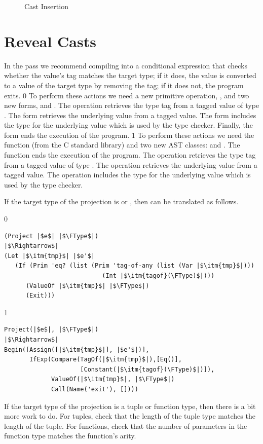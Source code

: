 \documentclass[7x10]{TimesAPriori_MIT}%
\def\racketEd{0}
\def\pythonEd{1}
\def\edition{0}
\numberwithin{theorem}{chapter}
\numberwithin{definition}{chapter}
\numberwithin{equation}{chapter}
\begin{document}
\begin{figure}[btp]
  \caption{Cast Insertion}
\label{fig:compile-r7-Lany}
\end{figure}



\section{Reveal Casts}
\label{sec:reveal-casts-Lany}


In the  pass we recommend compiling 
into a conditional expression that checks whether the value's tag
matches the target type; if it does, the value is converted to a value
of the target type by removing the tag; if it does not, the program
exits.
%
{\if\edition\racketEd
%
To perform these actions we need a new primitive operation,
, and two new forms,  and .
The  operation retrieves the type tag from a tagged
value of type .  The  form retrieves the
underlying value from a tagged value.  The  form
includes the type for the underlying value which is used by the type
checker.  Finally, the  form ends the execution of the
program.
%
\fi}
%
{\if\edition\pythonEd
%
To perform these actions we need the  function (from the C
standard library) and two new AST classes:  and
. The  function ends the execution of the
program.  The  operation retrieves the type tag from a
tagged value of type \ANYTY{}.  The  operation retrieves
the underlying value from a tagged value.  The 
operation includes the type for the underlying value which is used by
the type checker.
%
\fi}


If the target type of the projection is \BOOLTY{} or \INTTY{}, then
 can be translated as follows.
\begin{center}
\begin{minipage}{1.0\textwidth}
{\if\edition\racketEd    
\begin{lstlisting}
(Project |$e$| |$\FType$|)
|$\Rightarrow$|
(Let |$\itm{tmp}$| |$e'$|
   (If (Prim 'eq? (list (Prim 'tag-of-any (list (Var |$\itm{tmp}$|)))
                           (Int |$\itm{tagof}(\FType)$|)))
      (ValueOf |$\itm{tmp}$| |$\FType$|)
      (Exit)))
\end{lstlisting}
\fi}
{\if\edition\pythonEd
\begin{lstlisting}
Project(|$e$|, |$\FType$|)
|$\Rightarrow$|
Begin([Assign([|$\itm{tmp}$|], |$e'$|)],
       IfExp(Compare(TagOf(|$\itm{tmp}$|),[Eq()],
                     [Constant(|$\itm{tagof}(\FType)$|)]),
             ValueOf(|$\itm{tmp}$|, |$\FType$|)
             Call(Name('exit'), [])))
\end{lstlisting}
\fi}
\end{minipage}
\end{center}
If the target type of the projection is a tuple or function type, then
there is a bit more work to do. For tuples, check that the length of
the tuple type matches the length of the tuple. For functions, check
that the number of parameters in the function type matches the
function's arity.
\end{document}

